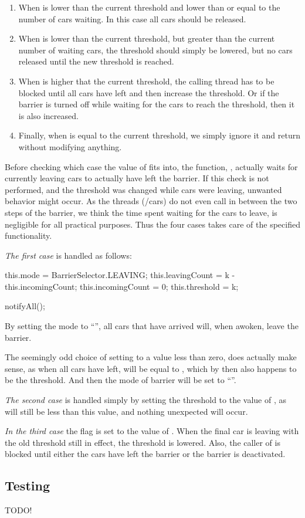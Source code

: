 \begin{enumerate}
\item When  is lower than the current threshold and lower than
  or equal to the number of cars waiting. In this case all cars should
  be released.
\item When  is lower than the current threshold, but greater
  than the current number of waiting cars, the threshold should simply
  be lowered, but no cars released until the new threshold is reached.
\item When  is higher that the current threshold, the calling
  thread has to be blocked until all cars have left and then increase
  the threshold. Or if the barrier is turned off while waiting for the
  cars to reach the threshold, then it is also increased.
\item Finally, when  is equal to the current threshold, we
  simply ignore it and return without modifying anything.
\end{enumerate}

Before checking which case the value of  fits into, the
function, , actually waits for currently leaving
cars to actually have left the barrier. If this check is not
performed, and the threshold was changed while cars were leaving,
unwanted behavior might occur. As the threads (/cars) do not even call
 in between the two steps of the barrier, we think the
time spent waiting for the cars to leave, is negligible for all
practical purposes. Thus the four cases takes care of the specified
functionality.

\emph{The first case} is handled as follows:
\begin{java}
this.mode = BarrierSelector.LEAVING;
this.leavingCount = k - this.incomingCount;
this.incomingCount = 0;
this.threshold = k;

notifyAll();
\end{java}

By setting the mode to ``'', all cars that have arrived
will, when awoken, leave the barrier.

The seemingly odd choice of setting  to a value
less than zero, does actually make sense, as when all cars have left,
 will be equal to , which by then also
happens to be the threshold. And then the mode of barrier will be set
to ``''.

\emph{The second case} is handled simply by setting the threshold to
the value of , as  will still be less than
this value, and nothing unexpected will occur.

\emph{In the third case} the flag  is set to
the value of . When the final car is leaving with the old
threshold still in effect, the threshold is lowered. Also, the caller
of  is blocked until either the cars have left the
barrier or the barrier is deactivated.


\subsection{Testing}
\label{sub:bar-test}
TODO!